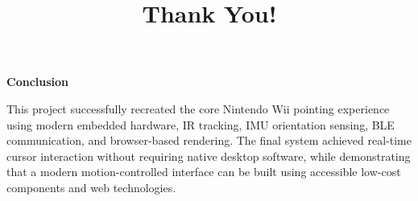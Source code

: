 \documentclass[aspectratio=169]{beamer}
\begin{document}
\begin{frame}

\vfill

\begin{center}

{\LARGE \color[rgb]{1.0,0.35,0.0}\textbf{Conclusion}}

\vspace{0.6cm}

\parbox{0.82\linewidth}{

\centering

This project successfully recreated the core Nintendo Wii pointing experience using modern embedded hardware, IR tracking, IMU orientation sensing, BLE communication, and browser-based rendering. The final system achieved real-time cursor interaction without requiring native desktop software, while demonstrating that a modern motion-controlled interface can be built using accessible low-cost components and web technologies.

}

\end{center}

\vfill

\end{frame}



{
\title{{\fontsize{30}{15}\selectfont \bfseries Thank You!}}
\author{}
\date{}
\frame{\titlepage}
}
\end{document}
